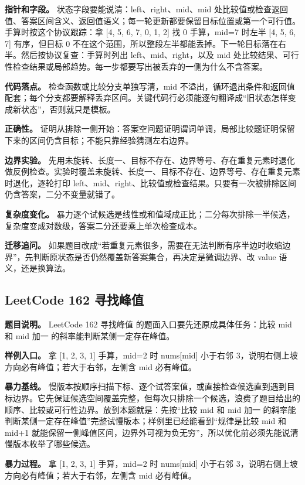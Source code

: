 \textbf{指针和字段。} 状态字段要能说清：left、right、mid、mid 处比较值或检查返回值、答案区间含义、返回值语义；每一轮更新都要保留目标位置或第一个可行值。手算时按这个协议跟踪：拿 [4, 5, 6, 7, 0, 1, 2] 找 0 手算，mid=7 时左半 [4, 5, 6, 7] 有序，但目标 0 不在这个范围，所以整段左半都能丢掉。下一轮目标落在右半。然后按协议复查：手算时列出 left、mid、right，以及 mid 处比较结果、可行性检查结果或局部趋势。每一步都要写出被丢弃的一侧为什么不含答案。

\textbf{代码落点。} 检查函数或比较分支单独写清，mid 不溢出，循环退出条件和返回值配套；每个分支都要解释丢弃区间。关键代码行必须能逐句翻译成“旧状态怎样变成新状态”，否则就只是模板。

\textbf{正确性。} 证明从排除一侧开始：答案空间题证明谓词单调，局部比较题证明保留下来的区间仍含目标；不能只靠经验猜测左右边界。

\textbf{边界实验。} 先用未旋转、长度一、目标不存在、边界等号、存在重复元素时退化做反例检查。实验时覆盖未旋转、长度一、目标不存在、边界等号、存在重复元素时退化，逐轮打印 left、mid、right、比较值或检查结果。只要有一次被排除区间仍含答案，二分不变量就错了。

\textbf{复杂度变化。} 暴力逐个试候选是线性或和值域成正比；二分每次排除一半候选，复杂度变成对数级，答案二分还要乘上单次检查成本。

\textbf{迁移追问。} 如果题目改成“若重复元素很多，需要在无法判断有序半边时收缩边界”，先判断原状态是否仍然覆盖新答案集合，再决定是微调边界、改 value 语义，还是换算法。

\subsection{LeetCode 162 寻找峰值}

\textbf{题目说明。} LeetCode 162 寻找峰值 的题面入口要先还原成具体任务：比较 mid 和 mid 加一 的斜率能判断某侧一定存在峰值。

\textbf{样例入口。} 拿 [1, 2, 3, 1] 手算，mid=2 时 nums[mid] 小于右邻 3，说明右侧上坡方向必有峰值；若大于右邻，左侧含 mid 必有峰值。

\textbf{暴力基线。} 慢版本按顺序扫描下标、逐个试答案值，或直接检查候选直到遇到目标边界。它先保证候选空间覆盖完整，但每次只排除一个候选，浪费了题目给出的顺序、比较或可行性边界。放到本题就是：先按“比较 mid 和 mid 加一 的斜率能判断某侧一定存在峰值”完整试慢版本；样例里已经能看到“规律是比较 mid 和 mid+1 就能保留一侧峰值区间，边界外可视为负无穷”，所以优化前必须先能说清慢版本枚举了哪些候选。

\textbf{暴力过程。} 拿 [1, 2, 3, 1] 手算，mid=2 时 nums[mid] 小于右邻 3，说明右侧上坡方向必有峰值；若大于右邻，左侧含 mid 必有峰值。

